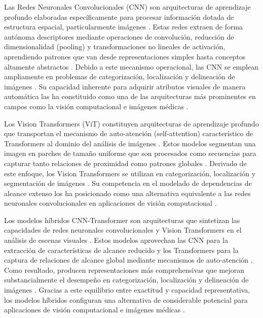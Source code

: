 Las Redes Neuronales Convolucionales (CNN) son arquitecturas de aprendizaje profundo elaboradas específicamente para procesar información dotada de estructura espacial, particularmente imágenes \cite{ref36}. Estas redes extraen de forma autónoma descriptores mediante operaciones de convolución, reducción de dimensionalidad (pooling) y transformaciones no lineales de activación, aprendiendo patrones que van desde representaciones simples hasta conceptos altamente abstractos \cite{ref36}. Debido a este mecanismo operacional, las CNN se emplean ampliamente en problemas de categorización, localización y delineación de imágenes \cite{ref36}. Su capacidad inherente para adquirir atributos visuales de manera automática las ha constituido como una de las arquitecturas más prominentes en campos como la visión computacional e imágenes médicas \cite{ref36}.

Los Vision Transformers (ViT) constituyen arquitecturas de aprendizaje profundo que transportan el mecanismo de auto-atención (self-attention) característico de Transformers al dominio del análisis de imágenes \cite{ref37}. Estos modelos segmentan una imagen en parches de tamaño uniforme que son procesados como secuencias para capturar tanto relaciones de proximidad como patrones globales \cite{ref37}. Derivado de este enfoque, los Vision Transformers se utilizan en categorización, localización y segmentación de imágenes \cite{ref37}. Su competencia en el modelado de dependencias de alcance extenso los ha posicionado como una alternativa equivalente a las redes neuronales convolucionales en aplicaciones de visión computacional \cite{ref37}.

Los modelos híbridos CNN-Transformer son arquitecturas que sintetizan las capacidades de redes neuronales convolucionales y Vision Transformers en el análisis de escenas visuales \cite{ref38}. Estos modelos aprovechan las CNN para la extracción de características de alcance reducido y los Transformers para la captura de relaciones de alcance global mediante mecanismos de auto-atención \cite{ref38}. Como resultado, producen representaciones más comprehensivas que mejoran substancialmente el desempeño en categorización, localización y delineación de imágenes \cite{ref38}. Gracias a este equilibrio entre exactitud y capacidad representativa, los modelos híbridos configuran una alternativa de considerable potencial para aplicaciones de visión computacional e imágenes médicas \cite{ref38}.

